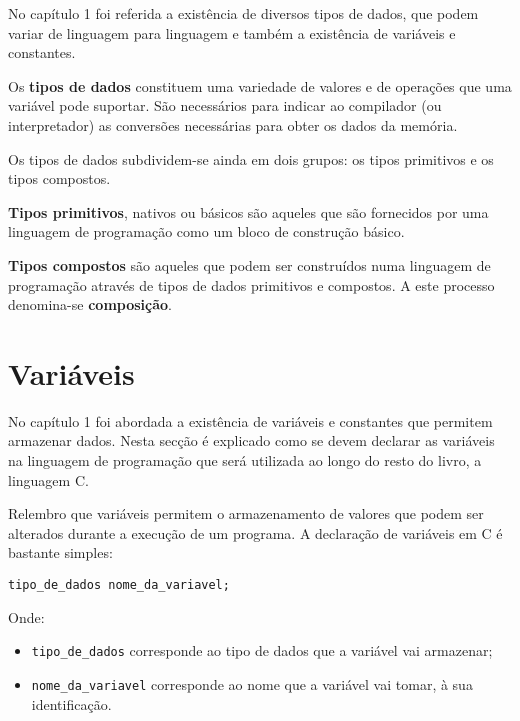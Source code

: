 No capítulo 1 foi referida a existência de diversos tipos de dados, que podem variar de linguagem para linguagem e também a existência de variáveis e constantes.

\begin{defi}
Os \textbf{tipos de dados} constituem uma variedade de valores e de operações que uma variável pode suportar. São necessários para indicar ao compilador (ou interpretador) as conversões necessárias para obter os dados da memória.
\end{defi}

Os tipos de dados subdividem-se ainda em dois grupos: os tipos primitivos e os tipos compostos.

\begin{defi}
\textbf{Tipos primitivos}, nativos ou básicos são aqueles que são fornecidos por uma linguagem de programação como um bloco de construção básico.
\end{defi}

\begin{defi}
\textbf{Tipos compostos} são aqueles que podem ser construídos numa linguagem de programação através de tipos de dados primitivos e compostos. A este processo denomina-se \textbf{composição}.
\end{defi}

\section{Variáveis}

No capítulo 1 foi abordada a existência de variáveis e constantes que permitem armazenar dados. Nesta secção é explicado como se devem declarar as variáveis na linguagem de programação que será utilizada ao longo do resto do livro, a linguagem C.

Relembro que variáveis permitem o armazenamento de valores que podem ser alterados durante a execução de um programa. A declaração de variáveis em C é bastante simples:

\begin{lstlisting}
tipo_de_dados nome_da_variavel;
\end{lstlisting}

Onde:

\begin{itemize}
\item \texttt{tipo\_de\_dados} corresponde ao tipo de dados que a variável vai armazenar;
\item \texttt{nome\_da\_variavel} corresponde ao nome que a variável vai tomar, à sua identificação.
\end{itemize}


